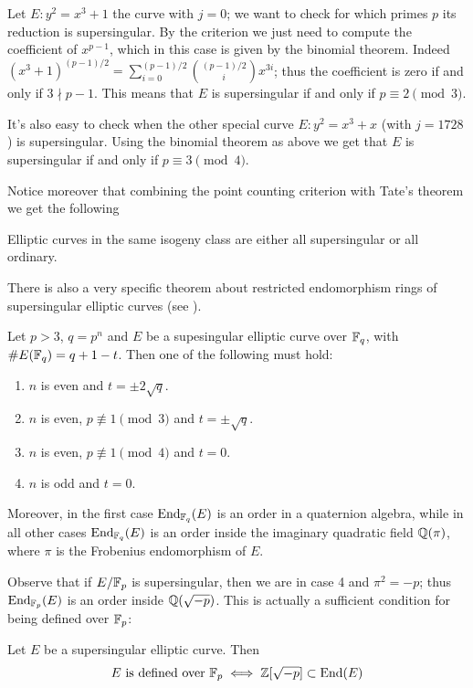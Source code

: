 \begin{example}
    Let $E:y^2=x^3+1$ the curve with $j=0$; we want to check for which primes $p$ its reduction is supersingular. By the criterion we just need to compute the coefficient of $x^{p-1}$, which in this case is given by the binomial theorem. Indeed $(x^3+1)^{(p-1)/2}=\sum_{i=0}^{(p-1)/2}\binom{(p-1)/2}{i}x^{3i}$; thus the coefficient is zero if and only if $3\nmid p-1$. This means that $E$ is supersingular if and only if $p\equiv2\pmod 3$.
\end{example}

\begin{example}
    It's also easy to check when the other special curve $E: y^2=x^3+x$ (with $j=1728$) is supersingular. Using the binomial theorem as above we get that $E$ is supersingular if and only if $p\equiv3\pmod4$.
\end{example}

Notice moreover that combining the point counting criterion with Tate's theorem we get the following
\begin{remark}
    Elliptic curves in the same isogeny class are either all supersingular or all ordinary.
\end{remark}

There is also a very specific theorem about restricted endomorphism rings of supersingular elliptic curves (see \cite{Waterhouse}).
\begin{theorem}\label{thm_endfp}
    Let $p>3$, $q=p^n$ and $E$ be a supesingular elliptic curve over $\mathbb{F}_q$, with $\# E(\mathbb{F}_q)=q+1-t$. Then one of the following must hold:
    \begin{enumerate}
        \item $n$ is even and $t=\pm2\sqrt{q}$.
        \item $n$ is even, $p\not\equiv1\pmod 3$ and $t=\pm\sqrt{q}$.
        \item $n$ is even, $p\not\equiv1\pmod 4$ and $t=0$.
        \item $n$ is odd and $t=0$.
    \end{enumerate}

    Moreover, in the first case $\operatorname{End}_{\mathbb{F}_q}(E)$ is an order in a quaternion algebra, while in all other cases $\operatorname{End}_{\mathbb{F}_q}(E)$ is an order inside the imaginary quadratic field $\mathbb{Q}(\pi)$, where $\pi$ is the Frobenius endomorphism of $E$.
\end{theorem}

Observe that if $E/\mathbb{F}_p$ is supersingular, then we are in case 4 and $\pi^2=-p$; thus $\operatorname{End}_{\mathbb{F}_p}(E)$ is an order inside $\mathbb{Q}(\sqrt{-p})$. This is actually a sufficient condition for being defined over $\mathbb{F}_p$:
\begin{proposition}
    Let $E$ be a supersingular elliptic curve. Then
    $$E \text{ is defined over } \mathbb{F}_p\iff \mathbb{Z}[\sqrt{-p}]\subset\operatorname{End}(E)$$
\end{proposition}

